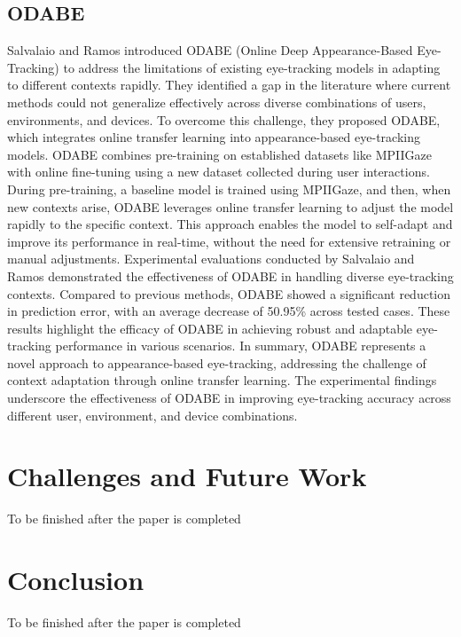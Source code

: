 \documentclass[conference]{IEEEtran}
\begin{document}
\subsection{ODABE}
Salvalaio and Ramos introduced ODABE (Online Deep Appearance-Based Eye-Tracking) \cite{IEEEhowto:odabe} to address the limitations of existing eye-tracking models in adapting to different contexts rapidly. They identified a gap in the literature where current methods could not generalize effectively across diverse combinations of users, environments, and devices. To overcome this challenge, they proposed ODABE, which integrates online transfer learning into appearance-based eye-tracking models. ODABE combines pre-training on established datasets like MPIIGaze with online fine-tuning using a new dataset collected during user interactions. During pre-training, a baseline model is trained using MPIIGaze, and then, when new contexts arise, ODABE leverages online transfer learning to adjust the model rapidly to the specific context. This approach enables the model to self-adapt and improve its performance in real-time, without the need for extensive retraining or manual adjustments. Experimental evaluations conducted by Salvalaio and Ramos demonstrated the effectiveness of ODABE in handling diverse eye-tracking contexts. Compared to previous methods, ODABE showed a significant reduction in prediction error, with an average decrease of 50.95\% across tested cases. These results highlight the efficacy of ODABE in achieving robust and adaptable eye-tracking performance in various scenarios. In summary, ODABE represents a novel approach to appearance-based eye-tracking, addressing the challenge of context adaptation through online transfer learning. The experimental findings underscore the effectiveness of ODABE in improving eye-tracking accuracy across different user, environment, and device combinations.

\section{Challenges and Future Work}
To be finished after the paper is completed
 

\section{Conclusion}
To be finished after the paper is completed
\end{document}
